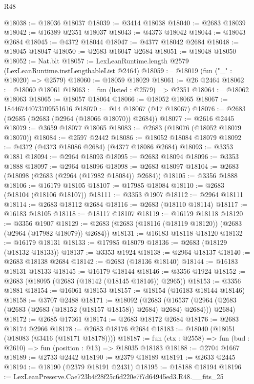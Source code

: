 \begin{lexlean}{R48}
\begin{coremodule}
@18038 := @18036 @18037
@18039 := @3414 @18038
@18040 := @2683 @18039
@18042 := @16389 @2351 @18037
@18043 := @4373 @18042
@18044 := @18043 @2684
@18045 := @4372 @18044
@18047 := @4377 @18042 @2684
@18048 := @18045 @18047
@18050 := @2683 @16047 @2684
@18051 := @18048 @18050
@18052 := Nat.blt
@18057 := LexLeanRuntime.length @2579 (LexLeanRuntime.instLengthableList @2464)
@18059 := @18019 (fun ("_" : @18020) => @2579)
@18060 := @18059 @18029
@18061 := @26 @2464
@18062 := @18060 @18061
@18063 := fun (listed : @2579) => @2351
@18064 := @18062 @18063
@18065 := @18057 @18064
@18066 := @18052 @18065
@18067 := 18446744073709551616
@18070 := @14 @18067 (@17 @18067)
@18076 := @2683 (@2685 (@2683 (@2964 (@18066 @18070)) @2684))
@18077 := @2616 @2445
@18079 := @3659 @18077 @18065
@18083 := @2683 (@18076 (@18052 @18079 @18070))
@18084 := @2597 @2442
@18086 := @18052 @18084 @18079
@18092 := @4372 (@4373 @18086 @2684) (@4377 @18086 @2684)
@18093 := @3353 @1881
@18094 := @2964 @18093
@18095 := @2683 @18094
@18096 := @3353 @1888
@18097 := @2964 @18096
@18098 := @2683 @18097
@18104 := @2683 (@18098 (@2683 (@2964 (@17982 @18084)) @2684))
@18105 := @3356 @1888
@18106 := @16179 @18105
@18107 := @17985 @18084
@18110 := @2683 (@18104 (@18106 @18107))
@18111 := @3353 @1907
@18112 := @2964 @18111
@18114 := @2683 @18112 @2684
@18116 := @2683 (@18110 @18114)
@18117 := @16183 @18105
@18118 := @18117 @18107
@18119 := @16179 @18118
@18120 := @3356 @1907
@18129 := @2683 (@2683 (@18116 (@18119 @18120)) (@2683 (@2964 (@17982 @18079)) @2684))
@18131 := @16183 @18118 @18120
@18132 := @16179 @18131
@18133 := @17985 @18079
@18136 := @2683 (@18129 (@18132 @18133))
@18137 := @3353 @1924
@18138 := @2964 @18137
@18140 := @2683 @18138 @2684
@18142 := @2683 (@18136 @18140)
@18144 := @16183 @18131 @18133
@18145 := @16179 @18144
@18146 := @3356 @1924
@18152 := @2683 (@18095 (@2683 (@18142 (@18145 @18146)) @2965))
@18153 := @3356 @1881
@18154 := @16061 @18153
@18157 := @18154 (@16183 @18144 @18146)
@18158 := @3707 @2488
@18171 := @18092
    (@2683
      (@16537 (@2964 (@2683 (@2683 (@2683 (@18152 (@18157 @18158)) @2684) @2684) @2684)))
      @2684)
@18172 := @2685 @17361
@18174 := @2683 @18172 @2684
@18176 := @2683 @18174 @2966
@18178 := @2683 @18176 @2684
@18183 := @18040 (@18051 (@18083 (@3416 (@18171 @18178))))
@18187 := fun (ctx : @2558) => fun (bud : @2610) => fun (position : @13) => @18035 @18183
@18188 := @2704 @1667
@18189 := @2733 @2442
@18190 := @2379 @18189
@18191 := @2633 @2445
@18194 := @18190 (@2379 @18191 @2431)
@18195 := @18188 @18194
@18196 := LexLeanPreserve.Cae723b4f28f25c6d220e7f7d64945ed3.R48.__fits_25

\end{coremodule}
\end{lexlean}
